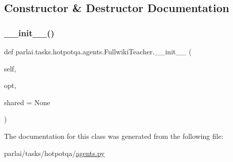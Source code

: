 \subsection{Constructor \& Destructor Documentation}
\mbox{\label{classparlai_1_1tasks_1_1hotpotqa_1_1agents_1_1FullwikiTeacher_a7e12fc08024330f828800caee978f7d7}} 
\subsubsection{\texorpdfstring{\+\_\+\+\_\+init\+\_\+\+\_\+()}{\_\_init\_\_()}}
{\footnotesize\ttfamily def parlai.\+tasks.\+hotpotqa.\+agents.\+Fullwiki\+Teacher.\+\_\+\+\_\+init\+\_\+\+\_\+ (\begin{DoxyParamCaption}\item[{}]{self,  }\item[{}]{opt,  }\item[{}]{shared = {\ttfamily None} }\end{DoxyParamCaption})}



The documentation for this class was generated from the following file\+:\begin{DoxyCompactItemize}
\item 
parlai/tasks/hotpotqa/\hyperlink{parlai_2tasks_2hotpotqa_2agents_8py}{agents.\+py}\end{DoxyCompactItemize}
